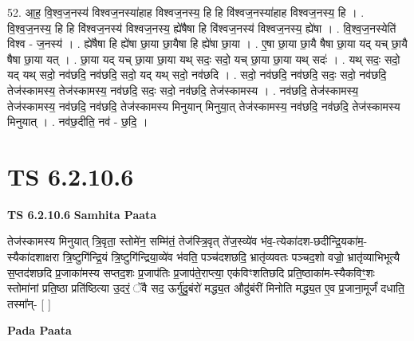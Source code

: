 \documentclass[17pt]{extarticle}
\begin{document}
52. आ॒ह॒ वि॒श्व॒ज॒नस्य॑ विश्वज॒नस्या॑हाह विश्वज॒नस्य॒ हि हि वि॑श्वज॒नस्या॑हाह विश्वज॒नस्य॒ हि । . वि॒श्व॒ज॒नस्य॒ हि हि वि॑श्वज॒नस्य॑ विश्वज॒नस्य॒ ह्ये॑षैषा हि वि॑श्वज॒नस्य॑ विश्वज॒नस्य॒ ह्ये॑षा । . वि॒श्व॒ज॒नस्येति॑ विश्व - ज॒नस्य॑ । . ह्ये॑षैषा हि ह्ये॑षा छा॒या छा॒यैषा हि ह्ये॑षा छा॒या । . ए॒षा छा॒या छा॒यै षैषा छा॒या यद् यच् छा॒यै षैषा छा॒या यत् । . छा॒या यद् यच् छा॒या छा॒या यथ् सदः॒ सदो॒ यच् छा॒या छा॒या यथ् सदः॑ । . यथ् सदः॒ सदो॒ यद् यथ् सदो॒ नव॑छदि॒ नव॑छदि॒ सदो॒ यद् यथ् सदो॒ नव॑छदि । . सदो॒ नव॑छदि॒ नव॑छदि॒ सदः॒ सदो॒ नव॑छदि॒ तेज॑स्कामस्य॒ तेज॑स्कामस्य॒ नव॑छदि॒ सदः॒ सदो॒ नव॑छदि॒ तेज॑स्कामस्य । . नव॑छदि॒ तेज॑स्कामस्य॒ तेज॑स्कामस्य॒ नव॑छदि॒ नव॑छदि॒ तेज॑स्कामस्य मिनुयान् मिनुया॒त् तेज॑स्कामस्य॒ नव॑छदि॒ नव॑छदि॒ तेज॑स्कामस्य मिनुयात् । . नव॑छ॒दीति॒ नव॑ - छ॒दि॒ । \newline
\pagebreak
{}

\section{ TS 6.2.10.6 }

\textbf{TS 6.2.10.6 } \newline
\textbf{Samhita Paata} \newline

तेज॑स्कामस्य मिनुयात् त्रि॒वृता॒ स्तोमे॑न॒ सम्मि॑तं॒ तेज॑स्त्रि॒वृत् ते॑ज॒स्व्ये॑व भ॑व॒-त्येका॑दश-छदीन्द्रि॒यका॑म॒-स्यैका॑दशाक्षरा त्रि॒ष्टुगि॑न्द्रि॒यं त्रि॒ष्टुगि॑न्द्रिया॒व्ये॑व भ॑वति॒ पञ्च॑दशछदि॒ भ्रातृ॑व्यवतः पञ्चद॒शो वज्रो॒ भ्रातृ॑व्याभिभूत्यै स॒प्तद॑शछदि प्र॒जाका॑मस्य सप्तद॒शः प्र॒जाप॑तिः प्र॒जाप॑ते॒राप्त्या॒ एक॑विꣳशतिछदि प्रति॒ष्ठाका॑म-स्यैकविꣳ॒॒शः स्तोमा॑नां प्रति॒ष्ठा प्रति॑ष्ठित्या उ॒दरं॒ ॅवै सद॒ ऊर्गु॑दु॒बंरो॑ मद्ध्य॒त औदु॑बंरीं मिनोति मद्ध्य॒त ए॒व प्र॒जाना॒मूर्जं॑ दधाति॒ तस्मा᳚न्- [  ] \newline

\textbf{Pada Paata} \newline
\end{document}
